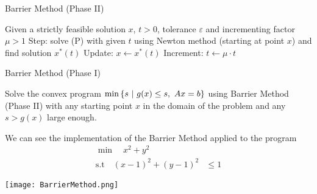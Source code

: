 \documentclass[answers]{exam}
\begin{document}
    \clearpage

    \begin{algorithm}
        \caption{Barrier Method (Phase II)}\label{alg:cap1}
        \begin{algorithmic}
        \STATE Given a strictly feasible solution $x$, $t>0$, tolerance $\varepsilon$ and incrementing factor $\mu>1$
            \STATE Step: solve (P) with given $t$ using Newton method (starting at point $x$) and find solution $x^*(t)$
            \STATE Update: $x\leftarrow x^*(t)$
            \STATE Increment: $t \leftarrow \mu \cdot t$
        \ENDWHILE
        \end{algorithmic}
    \end{algorithm}

    
    
    \begin{algorithm}
        \caption{Barrier Method (Phase I)}\label{alg:cap2}
        \begin{algorithmic}
        \STATE Solve the convex program $\min\left\{s \ \middle|\ g(x) \leq s,\ Ax = b\right\}$ using Barrier Method (Phase II) with any starting point $x$ in the domain of the problem and any $s> g(x)$ large enough. 
        \end{algorithmic}
    \end{algorithm}

    We can see the implementation of the Barrier Method applied to the program 
    \begin{align*}
        \min\quad x^2 + y^2& \\ 
        \text{s.t} \quad (x-1)^2 + (y-1)^2 &\leq 1
    \end{align*}

    \vspace*{1cm}

    \begin{center}
        \texttt{[image: BarrierMethod.png]}
    \end{center}
\end{document}
